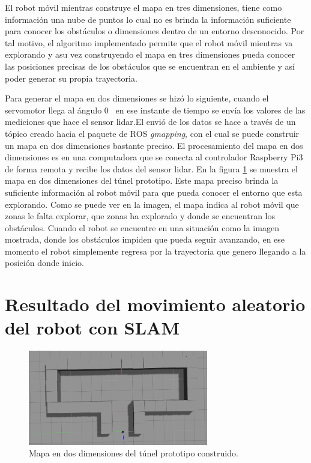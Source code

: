 El robot móvil mientras construye el mapa en tres dimensiones, tiene como información una nube 
de puntos lo cual no es brinda la información suficiente para conocer los obstáculos o 
dimensiones dentro de un entorno desconocido. Por tal motivo, el algoritmo implementado permite 
que el robot móvil mientras va explorando y asu vez construyendo el mapa en tres dimensiones 
pueda conocer las posiciones precisas de los obstáculos que se encuentran en el ambiente y así 
poder generar su propia trayectoria.

Para generar el mapa en dos dimensiones se hizó lo siguiente, cuando el servomotor llega al ángulo
0\grad~ en ese instante de tiempo se envía los valores de las mediciones que hace el sensor lidar.El
envió de los datos se hace a través de un tópico creado hacia el paquete de ROS \textit{gmapping}, 
con el cual se puede construir un mapa en dos dimensiones bastante preciso. El procesamiento del 
mapa en dos dimensiones es en una computadora que se conecta al controlador Raspberry Pi3 de forma 
remota y recibe los datos del sensor lidar. En la figura \ref{fig:SLAM201} se muestra el mapa en 
dos dimensiones del túnel prototipo. Este mapa preciso brinda la suficiente información al robot  
móvil para que pueda conocer el entorno que esta explorando. Como se puede ver en la imagen, el 
mapa indica al robot móvil que zonas le falta explorar, que zonas ha explorado y donde se 
encuentran los obstáculos. Cuando el robot se encuentre en una situación como la imagen mostrada, 
donde los obstáculos impiden que pueda seguir avanzando, en ese momento el robot simplemente regresa 
por la trayectoria que genero llegando a la posición donde inicio.
 


\section{Resultado del movimiento aleatorio del robot con SLAM}

\begin{figure}
  \centering \footnotesize
  \includegraphics[width=0.70\textwidth]{images/mapa_gazebo.png}
  \captionsetup{font=footnotesize}
  \caption{Mapa en dos dimensiones del túnel prototipo construido.}
  \label{fig:SLAM201}
\end{figure}

